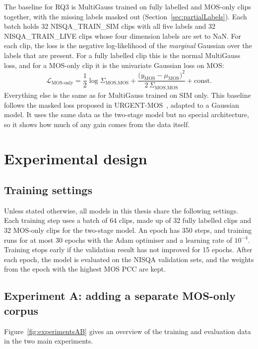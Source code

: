 \documentclass[
english,                 %
bibtex,                  %
includeExtraAbstracts, %
]{kththesis}
\numberwithin{listing}{chapter}
\begin{document}
The baseline for RQ3 is MultiGauss trained on fully labelled and MOS-only clips together, with the missing labels masked out (Section~\ref{sec:partialLabels}). Each batch holds 32 NISQA\_TRAIN\_SIM clips with all five labels and 32 NISQA\_TRAIN\_LIVE clips whose four dimension labels are set to NaN. For each clip, the loss is the negative log-likelihood of the \emph{marginal} Gaussian over the labels that are present. For a fully labelled clip this is the normal MultiGauss loss, and for a MOS-only clip it is the univariate Gaussian loss on MOS:
\begin{equation}
  \mathcal{L}_{\text{MOS-only}} = \frac{1}{2}\log \Sigma_{\text{MOS,MOS}} + \frac{\big(y_{\text{MOS}} - \mu_{\text{MOS}}\big)^2}{2\,\Sigma_{\text{MOS,MOS}}} + \text{const.}
  \label{eq:marginalLoss}
\end{equation}
Everything else is the same as for MultiGauss trained on SIM only. This baseline follows the masked loss proposed in URGENT-MOS~\cite{wang_urgentmos_2026}, adapted to a Gaussian model. It uses the same data as the two-stage model but no special architecture, so it shows how much of any gain comes from the data itself.

\section{Experimental design}
\label{sec:experimentalDesign}

\subsection{Training settings}

Unless stated otherwise, all models in this thesis share the following settings. Each training step uses a batch of 64 clips, made up of 32 fully labelled clips and 32 MOS-only clips for the two-stage model. An epoch has 350 steps, and training runs for at most 30 epochs with the Adam optimiser and a learning rate of $10^{-4}$. Training stops early if the validation result has not improved for 15 epochs. After each epoch, the model is evaluated on the NISQA validation sets, and the weights from the epoch with the highest MOS PCC are kept.

\subsection{Experiment A: adding a separate MOS-only corpus}
\label{sec:expA}

Figure~\ref{fig:experimentsAB} gives an overview of the training and evaluation data in the two main experiments.
\end{document}
